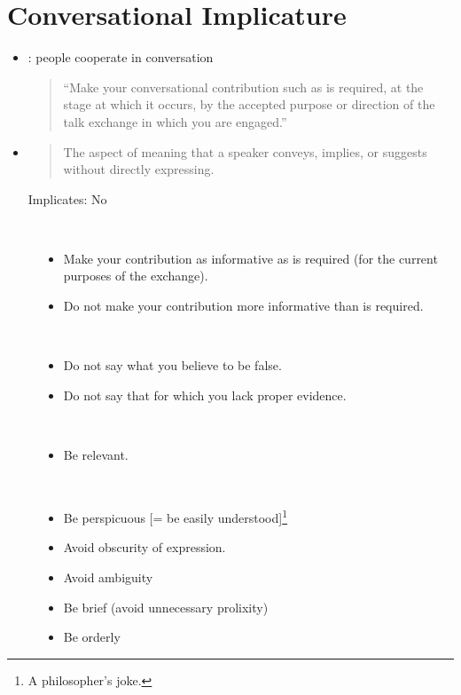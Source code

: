 \documentclass[a4paper,landscape,headrule,footrule,xetex]{foils}
\begin{document}
\section{Conversational Implicature}


\begin{itemize}
\item {}: people cooperate in conversation
  \begin{quote}
    ``Make your conversational contribution such as is required, at the stage at which it occurs, by the accepted purpose or direction of the talk exchange in which you are engaged.''
  \end{quote}
\item {}
  \begin{quote}
    The aspect of meaning that a speaker conveys, implies, or suggests
    without directly expressing.
  \end{quote}
  \begin{exe}
    \ex {}
    \ex {}
    \trans \textnormal{Implicates: No}
  \end{exe}

\end{itemize}

\begin{description}
\item [] ~
  \begin{itemize}
  \item Make your contribution as informative as is required (for the current purposes of the exchange).
  \item Do not make your contribution more informative than is required.
  \end{itemize}
\item [] ~
  \begin{itemize}
  \item Do not say what you believe to be false.
  \item Do not say that for which you lack proper evidence.
  \end{itemize}
\newpage
\item [] ~
  \begin{itemize}
  \item Be relevant.
  \end{itemize}
\item [] ~
  \begin{itemize}
  \item Be perspicuous [= be easily understood]\footnote{A
      philosopher's joke.}
  \item Avoid obscurity of expression.
  \item Avoid ambiguity
  \item Be brief (avoid unnecessary prolixity)
  \item Be orderly
  \end{itemize}
\end{description}
\end{document}
